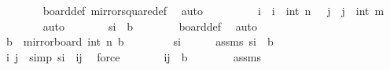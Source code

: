 \begin{isabellebody}
\ \ \ \ \ \ \isamarkupfalse%
\ board{\isacharunderscore}{\kern0pt}def\ mirror{}{\isacharunderscore}{\kern0pt}square{\isacharunderscore}{\kern0pt}def\ \isamarkupfalse%
\ auto\isanewline
\ \ \ \ \isamarkupfalse%
\ \isamarkupfalse%
\ {\isachardoublequoteopen}{}\ {\isasymle}\ i{\isacharprime}{\kern0pt}\ {\isasymand}\ i{\isacharprime}{\kern0pt}\ {\isasymle}\ int\ n{\isachardoublequoteclose}\ {\isachardoublequoteopen}{}\ {\isasymle}\ j{\isacharprime}{\kern0pt}\ {\isasymand}\ j{\isacharprime}{\kern0pt}\ {\isasymle}\ int\ m{\isachardoublequoteclose}\isanewline
\ \ \ \ \ \ \isamarkupfalse%
\ auto\isanewline
\ \ \ \ \isamarkupfalse%
\ \isamarkupfalse%
\ {\isachardoublequoteopen}s\isactrlsub i{\isacharprime}{\kern0pt}\ {\isasymin}\ {\isacharquery}{\kern0pt}b{\isachardoublequoteclose}\isanewline
\ \ \ \ \ \ \isamarkupfalse%
\ board{\isacharunderscore}{\kern0pt}def\ \isamarkupfalse%
\ auto\isanewline
\ \ \isamarkupfalse%
\isanewline
{}\isamarkupfalse%
\isanewline
\ \ \isamarkupfalse%
\ {\isachardoublequoteopen}{\isacharquery}{\kern0pt}b\ {\isasymsubseteq}\ mirror{}{\isacharunderscore}{\kern0pt}board\ {\isacharparenleft}{\kern0pt}int\ n{\isacharplus}{\kern0pt}{}{\isacharparenright}{\kern0pt}\ {\isacharquery}{\kern0pt}b{\isachardoublequoteclose}\isanewline
\ \ \isamarkupfalse%
\isanewline
\ \ \ \ \isamarkupfalse%
\ s\isactrlsub i\isanewline
\ \ \ \ \isamarkupfalse%
\ assms{\isacharcolon}{\kern0pt}\ {\isachardoublequoteopen}s\isactrlsub i\ {\isasymin}\ {\isacharquery}{\kern0pt}b{\isachardoublequoteclose}\isanewline
\ \ \ \ \isamarkupfalse%
\ \isamarkupfalse%
\ i\ j\ \ {\isacharbrackleft}{\kern0pt}simp{\isacharbrackright}{\kern0pt}{\isacharcolon}{\kern0pt}\ {\isachardoublequoteopen}s\isactrlsub i\ {\isacharequal}{\kern0pt}\ {\isacharparenleft}{\kern0pt}i{\isacharcomma}{\kern0pt}j{\isacharparenright}{\kern0pt}{\isachardoublequoteclose}\ \isamarkupfalse%
\ force\isanewline
\ \ \ \ \isamarkupfalse%
\ \isamarkupfalse%
\ {\isachardoublequoteopen}{\isacharparenleft}{\kern0pt}i{\isacharcomma}{\kern0pt}j{\isacharparenright}{\kern0pt}\ {\isasymin}\ {\isacharquery}{\kern0pt}b{\isachardoublequoteclose}\isanewline
\ \ \ \ \ \ \isamarkupfalse%
\ assms\ \isamarkupfalse%

\end{isabellebody}
